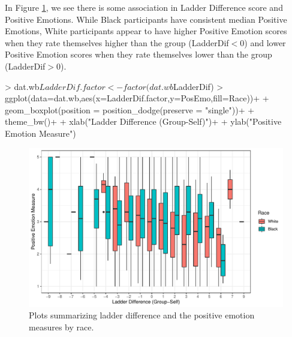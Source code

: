 \documentclass{article}
\begin{document}
\begin{enumerate}
\begin{enumerate}
In Figure \ref{Fig:boxplot1}, we see there is some
association in Ladder Difference score and Positive 
Emotions. While Black participants have consistent median
Positive Emotions, White participants appear to have higher
Positive Emotion scores when they rate themselves higher 
than the group (LadderDif$<$0) and lower Positive Emotion
scores when they rate themselves lower than the group
(LadderDif$>$0). 
\begin{Schunk}
\begin{Sinput}
> dat.wb$LadderDif.factor<-factor(dat.wb$LadderDif)
> ggplot(data=dat.wb,aes(x=LadderDif.factor,y=PosEmo,fill=Race))+
+ geom_boxplot(position = position_dodge(preserve = "single"))+
+ theme_bw()+
+ xlab("Ladder Difference (Group-Self)")+
+ ylab("Positive Emotion Measure")
\end{Sinput}
\end{Schunk}
\begin{figure}[H]
\centering
\includegraphics{finalExam-027}
\caption{Plots summarizing ladder difference and the positive emotion measures
by race.} \label{Fig:boxplot1}
\end{figure}
\end{enumerate}

\end{enumerate}
\end{document}
